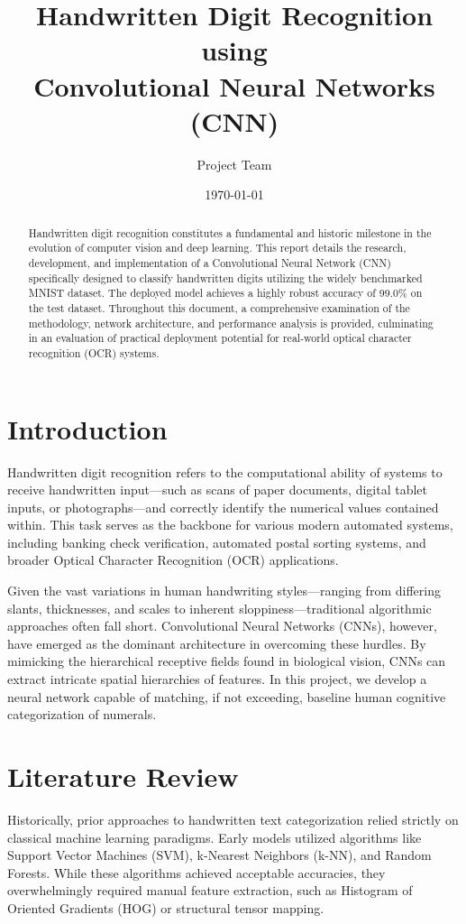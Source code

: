 \documentclass[12pt,a4paper]{article}
\title{\huge \textbf{Handwritten Digit Recognition using \\ Convolutional Neural Networks (CNN)}}
\author{Project Team}
\date{\today}
\begin{document}
\maketitle

\begin{abstract}
Handwritten digit recognition constitutes a fundamental and historic milestone in the evolution of computer vision and deep learning. This report details the research, development, and implementation of a Convolutional Neural Network (CNN) specifically designed to classify handwritten digits utilizing the widely benchmarked MNIST dataset. The deployed model achieves a highly robust accuracy of 99.0\% on the test dataset. Throughout this document, a comprehensive examination of the methodology, network architecture, and performance analysis is provided, culminating in an evaluation of practical deployment potential for real-world optical character recognition (OCR) systems.
\end{abstract}

\tableofcontents
\newpage

\section{Introduction}
Handwritten digit recognition refers to the computational ability of systems to receive handwritten input—such as scans of paper documents, digital tablet inputs, or photographs—and correctly identify the numerical values contained within. This task serves as the backbone for various modern automated systems, including banking check verification, automated postal sorting systems, and broader Optical Character Recognition (OCR) applications. 

Given the vast variations in human handwriting styles—ranging from differing slants, thicknesses, and scales to inherent sloppiness—traditional algorithmic approaches often fall short. Convolutional Neural Networks (CNNs), however, have emerged as the dominant architecture in overcoming these hurdles. By mimicking the hierarchical receptive fields found in biological vision, CNNs can extract intricate spatial hierarchies of features. In this project, we develop a neural network capable of matching, if not exceeding, baseline human cognitive categorization of numerals.

\section{Literature Review}
Historically, prior approaches to handwritten text categorization relied strictly on classical machine learning paradigms. Early models utilized algorithms like Support Vector Machines (SVM), k-Nearest Neighbors (k-NN), and Random Forests. While these algorithms achieved acceptable accuracies, they overwhelmingly required manual feature extraction, such as Histogram of Oriented Gradients (HOG) or structural tensor mapping. 
\end{document}
